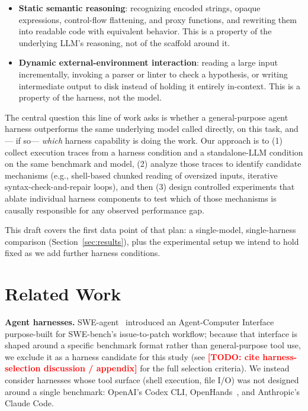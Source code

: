 \documentclass[11pt]{article}
\newcommand{\todo}[1]{\textcolor{red}{\textbf{[TODO: #1]}}}
\begin{document}
\begin{itemize}
  \item \textbf{Static semantic reasoning}: recognizing encoded strings,
    opaque expressions, control-flow flattening, and proxy functions, and
    rewriting them into readable code with equivalent behavior. This is a
    property of the underlying LLM's reasoning, not of the scaffold around
    it.
  \item \textbf{Dynamic external-environment interaction}: reading a large
    input incrementally, invoking a parser or linter to check a hypothesis,
    or writing intermediate output to disk instead of holding it entirely
    in-context. This is a property of the harness, not the model.
\end{itemize}

The central question this line of work asks is whether a general-purpose
agent harness outperforms the same underlying model called directly, on
this task, and--- if so--- \emph{which} harness capability is doing the
work. Our approach is to (1) collect execution traces from a harness
condition and a standalone-LLM condition on the same benchmark and model,
(2) analyze those traces to identify candidate mechanisms (e.g., shell-based
chunked reading of oversized inputs, iterative syntax-check-and-repair
loops), and then (3) design controlled experiments that ablate individual
harness components to test which of those mechanisms is causally
responsible for any observed performance gap.

This draft covers the first data point of that plan: a single-model,
single-harness comparison (Section~\ref{sec:results}), plus the
experimental setup we intend to hold fixed as we add further harness
conditions.

\section{Related Work}
\label{sec:related}

\textbf{Agent harnesses.} SWE-agent~\cite{yang2024sweagent} introduced an
Agent-Computer Interface purpose-built for SWE-bench's issue-to-patch
workflow; because that interface is shaped around a specific benchmark
format rather than general-purpose tool use, we exclude it as a harness
candidate for this study (see \todo{cite harness-selection discussion /
appendix} for the full selection criteria). We instead consider harnesses
whose tool surface (shell execution, file I/O) was not designed around a
single benchmark: OpenAI's Codex CLI, OpenHands~\cite{wang2024openhands},
and Anthropic's Claude Code.
\end{document}
